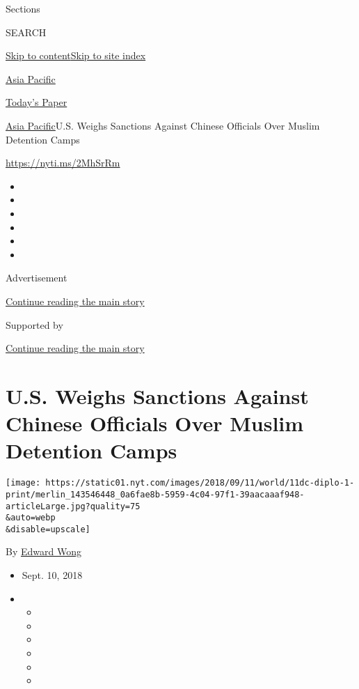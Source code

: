 Sections

SEARCH

\protect\hyperlink{site-content}{Skip to
content}\protect\hyperlink{site-index}{Skip to site index}

\href{https://www.nytimes.com/section/world/asia}{Asia Pacific}

\href{https://myaccount.nytimes.com/auth/login?response_type=cookie\&client_id=vi}{}

\href{https://www.nytimes.com/section/todayspaper}{Today's Paper}

\href{/section/world/asia}{Asia Pacific}\textbar{}U.S. Weighs Sanctions
Against Chinese Officials Over Muslim Detention Camps

\url{https://nyti.ms/2MhSrRm}

\begin{itemize}
\item
\item
\item
\item
\item
\item
\end{itemize}

Advertisement

\protect\hyperlink{after-top}{Continue reading the main story}

Supported by

\protect\hyperlink{after-sponsor}{Continue reading the main story}

\hypertarget{us-weighs-sanctions-against-chinese-officials-over-muslim-detention-camps}{%
\section{U.S. Weighs Sanctions Against Chinese Officials Over Muslim
Detention
Camps}\label{us-weighs-sanctions-against-chinese-officials-over-muslim-detention-camps}}

\texttt{[image: https://static01.nyt.com/images/2018/09/11/world/11dc-diplo-1-print/merlin\_143546448\_0a6fae8b-5959-4c04-97f1-39aacaaaf948-articleLarge.jpg?quality=75\\\&auto=webp\\\&disable=upscale]}

By \href{https://www.nytimes.com/by/edward-wong}{Edward Wong}

\begin{itemize}
\item
  Sept. 10, 2018
\item
  \begin{itemize}
  \item
  \item
  \item
  \item
  \item
  \item
  \end{itemize}
\end{itemize}

